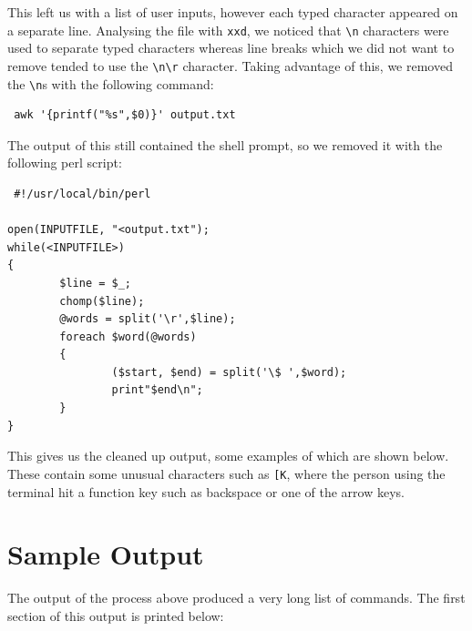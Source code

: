 \documentclass[a4paper,
    11pt,
    normalheadings,
    parindent,
    UKenglish,
    abstracton,
    ]{scrartcl}
\begin{document}
This left us with a list of user inputs, however each typed character appeared on a separate line.
Analysing the file with \texttt{xxd}, we noticed that \texttt{\textbackslash{}n} characters were used to separate typed characters whereas line breaks which we did not want to remove tended to use the \texttt{\textbackslash{}n\textbackslash{}r} character.
Taking advantage of this, we removed the \texttt{\textbackslash{}n}s with the following command:
\begin{verbatim}
 awk '{printf("%s",$0)}' output.txt
 \end{verbatim}

 The output of this still contained the shell prompt, so we removed it with the following perl script:
 \begin{verbatim}
 #!/usr/local/bin/perl

open(INPUTFILE, "<output.txt");
while(<INPUTFILE>)
{
        $line = $_;
        chomp($line);
        @words = split('\r',$line);
        foreach $word(@words)
        {
                ($start, $end) = split('\$ ',$word);
                print"$end\n";
        }
}
\end{verbatim}

This gives us the cleaned up output, some examples of which are shown below.
These contain some unusual characters such as \texttt{[K}, where the person using the terminal hit a function key such as backspace or one of the arrow keys.



\section{Sample Output}
The output of the process above produced a very long list of commands. The first section of this output is printed below:
\end{document}
